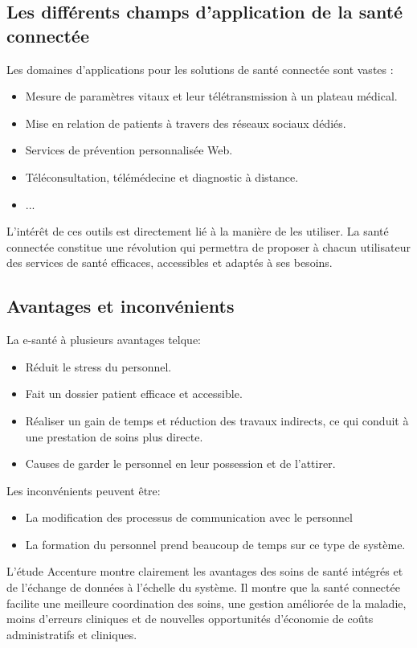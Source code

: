 \documentclass[12pt]{article}
\begin{document}
\subsection{Les différents champs d’application de la santé connectée}
Les domaines d’applications pour les solutions de santé connectée sont vastes :
\begin{itemize}
	\item Mesure de paramètres vitaux et leur télétransmission à un plateau médical.
	\item Mise en relation de patients à travers des réseaux sociaux dédiés.
	\item Services de prévention personnalisée Web.
	\item Téléconsultation, télémédecine et diagnostic à distance.
	\item ...\\
\end{itemize}

L’intérêt de ces outils est directement lié à la manière de les utiliser. La santé connectée constitue une révolution qui permettra de proposer à chacun utilisateur des services de santé efficaces, accessibles et adaptés à ses besoins.

\subsection{Avantages et inconvénients}
La e-santé à plusieurs avantages telque:
\begin{itemize}
	\item Réduit le stress du personnel.
	\item Fait un dossier patient efficace et accessible.
	\item Réaliser un gain de temps et réduction des travaux indirects, ce qui conduit à une prestation de soins plus directe.
	\item Causes de garder le personnel en leur possession et de l'attirer.
\end{itemize}

Les inconvénients peuvent être:
\begin{itemize}
	\item La modification des processus de communication avec le personnel
	\item La formation du personnel prend beaucoup de temps sur ce type de système.\\
\end{itemize}

L'étude Accenture \cite{28} montre clairement les avantages des soins de santé intégrés et de l'échange de données à l'échelle du système. Il montre que la santé connectée facilite une meilleure coordination des soins, une gestion améliorée de la maladie, moins d'erreurs cliniques et de nouvelles opportunités d'économie de coûts administratifs et cliniques.
\end{document}

